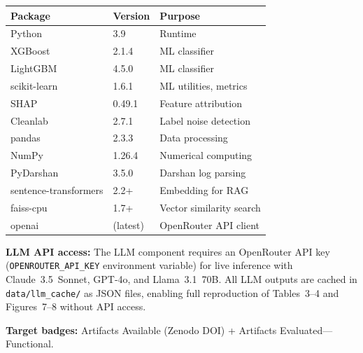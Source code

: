 \documentclass[conference]{IEEEtran}
\begin{document}
\vspace{1ex}
\begin{center}
\begin{tabular}{lll}
\toprule
Package & Version & Purpose \\
\midrule
Python      & 3.9     & Runtime \\
XGBoost     & 2.1.4   & ML classifier \\
LightGBM    & 4.5.0   & ML classifier \\
scikit-learn & 1.6.1  & ML utilities, metrics \\
SHAP        & 0.49.1  & Feature attribution \\
Cleanlab    & 2.7.1   & Label noise detection \\
pandas      & 2.3.3   & Data processing \\
NumPy       & 1.26.4  & Numerical computing \\
PyDarshan   & 3.5.0   & Darshan log parsing \\
sentence-transformers & 2.2+ & Embedding for RAG \\
faiss-cpu   & 1.7+    & Vector similarity search \\
openai      & (latest) & OpenRouter API client \\
\bottomrule
\end{tabular}
\end{center}

\vspace{1ex}
\noindent\textbf{LLM API access:} The LLM component requires an
OpenRouter API key (\texttt{OPENROUTER\_API\_KEY} environment variable)
for live inference with Claude~3.5~Sonnet, GPT-4o, and Llama~3.1~70B.
All LLM outputs are cached in \texttt{data/llm\_cache/} as JSON files,
enabling full reproduction of Tables~3--4 and Figures~7--8 without
API access.

\noindent\textbf{Target badges:} Artifacts Available (Zenodo DOI) +
Artifacts Evaluated---Functional.
\end{document}
